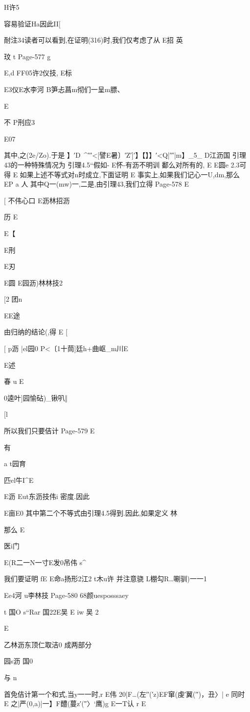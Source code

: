 {H许5

容易验证Ha因此II[

耐注34读者可以看到,在证明(316)时,我们仅考虑了从
E招
英

玟
t
Page-577
g

E,d
FF05许2仪技,
E标

E3仪E水李河
B笋忐菖m彻们一呈m膘、

E

不
P刑应3

E07

其中,之(2e/Zo).于是
】′D~^′′′<[譬E暑〕′Z′]′】【】】′<Q|′″|m】_5_
D江沥国
引理43的一种特殊情况为
引理4.5“假如-
E怀-有沥不明训
鄱么对所有的,
E
E圆e
2.3可得
E
如果上述不等式对n时成立,下面证明
E
事实上,如果我们记心一U,dm,那么
EP
a
人
其中Q一(mw)一,二是,由引理43,我们立得
Page-578
E

[
不伟心口
E沥林招沥

历
E

E【

E刑

E刃

E圆
E园沥)林林技2

[2
团n

EE途

由归纳的结论(,得
E
[

[
p沥
|el园0
P<〔1十茼]廷h+曲岖_m川E

E述

春
u
E

0逵叶]园愉砧)_锹叭‖

[l

所以我们只要佶计
Page-579
E

有

a
t园育

匹el牛I^E

E沥
Eut东沥技伟i
密度.因此

E亩E0
其中第二个不等式由引理4.5得到.因此,如果定义
林

那么
E

医i门

E(R二一N一寸E发0吊伟
s^

我们要证明
fE
E命a扬形2江2
t木u许
并注意骁
L棚勾R…唰驯)一一1

Ee4河
u李林技
Page-580
68颜uesposssaey

t
国O
s“Rar
国22E吴
E
iw
吴
2

E

乙林沥东顶仁取洁0
成两部分

园s沥
国0

与
n

首免佶计第一个和式,当y一一时,r
E伟
20|F…(左′′(′z)EF窜(虔′翼(′′)，丑〉|
e
同时
E
之|严(0,a)|一】F醴(蔓z′(″〉`鹰)g
E一T认
r
E

}
